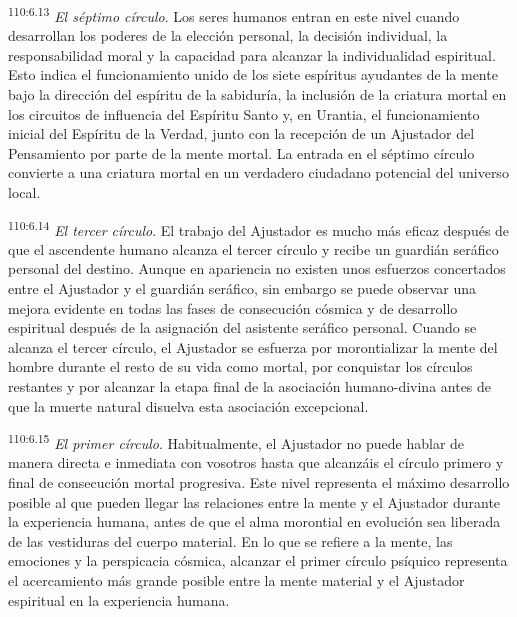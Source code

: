 \documentclass[twoside, 11pt]{book}
\begin{document}
\par
\textsuperscript{110:6.13} \textit{El séptimo círculo}. Los seres humanos entran en este nivel cuando desarrollan los poderes de la elección personal, la decisión individual, la responsabilidad moral y la capacidad para alcanzar la individualidad espiritual. Esto indica el funcionamiento unido de los siete espíritus ayudantes de la mente bajo la dirección del espíritu de la sabiduría, la inclusión de la criatura mortal en los circuitos de influencia del Espíritu Santo y, en Urantia, el funcionamiento inicial del Espíritu de la Verdad, junto con la recepción de un Ajustador del Pensamiento por parte de la mente mortal. La entrada en el séptimo círculo convierte a una criatura mortal en un verdadero ciudadano potencial del universo local.

\par
\textsuperscript{110:6.14} \textit{El tercer círculo}. El trabajo del Ajustador es mucho más eficaz después de que el ascendente humano alcanza el tercer círculo y recibe un guardián seráfico personal del destino. Aunque en apariencia no existen unos esfuerzos concertados entre el Ajustador y el guardián seráfico, sin embargo se puede observar una mejora evidente en todas las fases de consecución cósmica y de desarrollo espiritual después de la asignación del asistente seráfico personal. Cuando se alcanza el tercer círculo, el Ajustador se esfuerza por morontializar la mente del hombre durante el resto de su vida como mortal, por conquistar los círculos restantes y por alcanzar la etapa final de la asociación humano-divina antes de que la muerte natural disuelva esta asociación excepcional.

\par
\textsuperscript{110:6.15} \textit{El primer círculo}. Habitualmente, el Ajustador no puede hablar de manera directa e inmediata con vosotros hasta que alcanzáis el círculo primero y final de consecución mortal progresiva. Este nivel representa el máximo desarrollo posible al que pueden llegar las relaciones entre la mente y el Ajustador durante la experiencia humana, antes de que el alma morontial en evolución sea liberada de las vestiduras del cuerpo material. En lo que se refiere a la mente, las emociones y la perspicacia cósmica, alcanzar el primer círculo psíquico representa el acercamiento más grande posible entre la mente material y el Ajustador espiritual en la experiencia humana.
\end{document}
